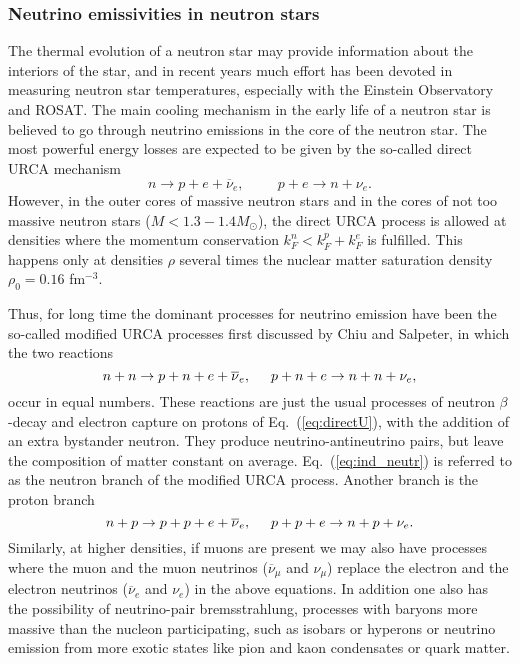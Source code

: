 \subsubsection{Neutrino emissivities in neutron stars}



The thermal evolution of a neutron star may provide information
about the interiors of the star, and in recent years much effort
has been devoted in measuring neutron star temperatures, especially
with the Einstein Observatory and ROSAT.
The main cooling mechanism in the early life of a neutron star is
believed to go through neutrino emissions in the core
of the neutron star.
The most powerful energy losses are expected to be given by the so-called
direct URCA mechanism
\begin{equation}
    n\rightarrow p +e +\overline{\nu}_e, \hspace{1cm} p+e \rightarrow
    n+\nu_e .
    \label{eq:directU}
\end{equation}
However, in the outer cores of massive neutron stars and in the
cores of not too massive neutron stars ($M < 1.3-1.4 M_{\odot}$), the direct
URCA process is allowed at densities
where the momentum conservation $k_F^n < k_F^p + k_F^e$ is
fulfilled. This happens
only at densities $\rho$ several times
the nuclear matter saturation density $\rho_0 =0.16$ fm$^{-3}$.


Thus, for long time the dominant processes for neutrino emission
have been the so-called modified URCA processes first discussed by
Chiu and Salpeter, in which the two reactions
\begin{equation}
    n+n\rightarrow p+n +e +\overline{\nu}_e,
    \hspace{0.5cm} p+n+e \rightarrow
    n+n+\nu_e ,
    \label{eq:ind_neutr}
\end{equation}
occur in equal numbers.
These reactions are just the usual processes of neutron
$\beta$-decay and electron capture on protons of Eq.\ (\ref{eq:directU}),
with the addition of an extra bystander neutron. They produce
neutrino-antineutrino pairs, but leave the composition of matter constant
on average. Eq.\ (\ref{eq:ind_neutr}) is referred to as the
neutron branch of the modified URCA process. Another branch is the
proton branch
\begin{equation}
    n+p\rightarrow p+p +e +\overline{\nu}_e, \hspace{0.5cm} p+p+e
    \rightarrow
    n+p+\nu_e .
    \label{eq:ind_prot}
\end{equation}
Similarly, at higher densities, if muons are present we may also
have  processes where the muon and the muon neutrinos 
($\overline{\nu}_{\mu}$ and $\nu_{\mu}$) 
replace the electron and the electron neutrinos
($\overline{\nu}_e$ and $\nu_e$) in the above equations.
In addition one also has the possibility of neutrino-pair
bremsstrahlung,
processes with baryons more massive than the nucleon
participating, such as isobars or hyperons
or neutrino emission from more exotic states like pion and kaon
condensates or quark matter.

